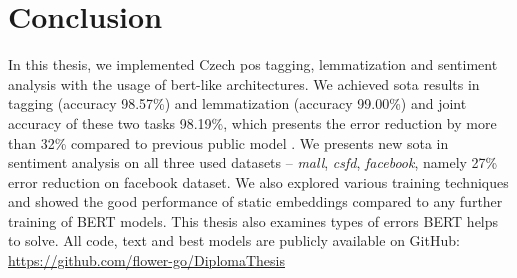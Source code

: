 \chapter*{Conclusion}
\label{chap:concl}
In this thesis, we implemented Czech \acrlong{pos} tagging, lemmatization and sentiment analysis with the usage of \acrlong{bert}-like architectures. We achieved \acrlong{sota} results in tagging (accuracy 98.57\%) and lemmatization (accuracy 99.00\%) and joint accuracy of these two tasks 98.19\%, which presents the error reduction by more than 32\% compared to previous public model \citep{Strakova}. We presents new \acrshort{sota} in sentiment analysis on all three used datasets -- \textit{mall}, \textit{csfd}, \textit{facebook}, namely 27\% error reduction on facebook dataset. We also explored various training techniques and showed the good performance of static embeddings compared to any further training of BERT models. This thesis also examines types of errors BERT helps to solve. All code, text and best models are publicly available on GitHub: \url{https://github.com/flower-go/DiplomaThesis}
